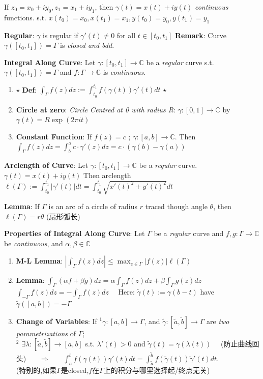 \documentclass[9pt]{article}
\begin{document}
\quad If {\footnotesize $z_0=x_0+iy_0,z_1=x_1+iy_1$, then $\gamma(t)=x(t)+iy(t)$ \textit{continuous} functions. s.t. $x(t_0)=x_0,x(t_1)=x_1,y(t_0)=y_0,y(t_1)=y_1$}

\quad \textbf{Regular}: $\gamma$ is regular if $\gamma'(t)\ne0$ for all $t\in[t_0,t_1]$ \qquad \textbf{Remark}: Curve $\gamma([t_0,t_1])=\Gamma$ is \textit{closed and bdd}.

\textbf{Integral Along Curve}: Let $\gamma:[t_0,t_1]\to\mathbb{C}$ be a \textit{regular} curve s.t. $\gamma([t_0,t_1])=\Gamma$ and $f:\Gamma\to\mathbb{C}$ is \textit{continuous}.

\begin{enumerate}[itemsep=-2pt, topsep=-2pt]
    \item $\star$ \textbf{Def}: $\int_{\Gamma}f(z)dz:=\int_{t_0}^{t_1}f(\gamma(t))\gamma'(t)dt$ $\star$
    \item \textbf{Circle at zero}: \textit{Circle Centred at 0 with radius R}: $\gamma:[0,1]\to\mathbb{C}$ by $\gamma(t)=R\exp(2\pi it)$
    \item \textbf{Constant Function}: If $f(z)=c$ ; $\gamma:[a,b]\to\mathbb{C}$. Then $\int_{\Gamma}f(z)dz=\int^a_b c\cdot\gamma'(z) dz = c\cdot(\gamma(b)-\gamma(a))$
\end{enumerate}

\textbf{Arclength of Curve}: {\small Let $\gamma:[t_0,t_1]\to\mathbb{C}$ be a \textit{regular} curve. $\gamma(t)=x(t)+iy(t)$ Then arclength $\ell(\Gamma):=\int_{t_0}^{t_1}|\gamma'(t)|dt=\int^{t_1}_{t_0}\sqrt{x'(t)^2+y'(t)^2}dt$}

\quad \textbf{Lemma}: If $\Gamma$ is an arc of a circle of radius $r$ traced though angle $\theta$, then $\ell(\Gamma)=r\theta$ {\small (扇形弧长)}

\textbf{Properties of Integral Along Curve}: Let $\Gamma$ be a \textit{regular} curve and $f,g:\Gamma\to\mathbb{C}$ be \textit{continuous}, and $\alpha,\beta\in\mathbb{C}$

\begin{enumerate}[itemsep=-2pt, topsep=-2pt]
    \item \textbf{M-L Lemma}: $|\int_{\Gamma}f(z)dz|\leq \max_{z\in\Gamma}|f(z)|\ell(\Gamma)$
    \item \textbf{Lemma}: $\int_{\Gamma}(\alpha f+\beta g)dz=\alpha\int_{\Gamma}f(z)dz+\beta\int_{\Gamma}g(z)dz$ \qquad $\int_{-\Gamma}f(z)dz=-\int_{\Gamma}f(z)dz$ \ \ {\scriptsize Here: $\widetilde{\gamma}(t):=\gamma(b-t)$ have $\widetilde{\gamma}([a,b])=-\Gamma$}
    \item \textbf{Change of Variables}: {\small If $^1\gamma:[a,b]\to\Gamma$, and $\widetilde{\gamma}:[\widetilde{a},\widetilde{b}]\to\Gamma$ are \textit{two parametrizations} of $\Gamma$;} \\
    {\small $^2$ $\exists\lambda:[\widetilde{a},\widetilde{b}]\to[a,b]$ s.t. $\lambda'(t)>0$ and $\widetilde{\gamma}(t)=\gamma(\lambda(t))$ \ \ {\scriptsize (防止曲线回头)} \ \ \ $\Rightarrow$ \ \ \ $\int^b_a f(\gamma(t))\gamma'(t)dt=\int^{\widetilde{b}}_{\widetilde{a}}f(\widetilde{\gamma}(t))\widetilde{\gamma}'(t)dt$}. \\
    {\small (特别的,如果$\Gamma$是closed,$f$在$\Gamma$上的积分与哪里选择起/终点无关)}
\end{enumerate}
\end{document}
